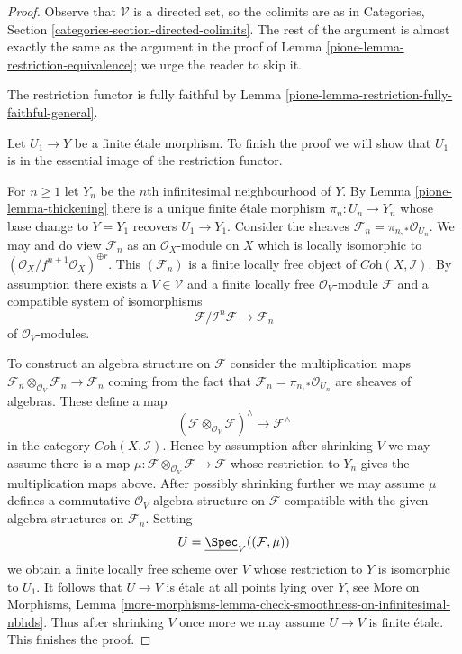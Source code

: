 \begin{proof}

Observe that $\mathcal{V}$ is a directed set, so the colimits are
as in Categories, Section \ref{categories-section-directed-colimits}.
The rest of the argument is almost exactly the same as the argument
in the proof of Lemma \ref{pione-lemma-restriction-equivalence}; we urge
the reader to skip it.

\medskip\noindent
The restriction functor is fully faithful by
Lemma \ref{pione-lemma-restriction-fully-faithful-general}.

\medskip\noindent
Let $U_1 \to Y$ be a finite \'etale morphism. To finish the proof
we will show that $U_1$ is in the essential image of the
restriction functor.

\medskip\noindent
For $n \geq 1$ let $Y_n$ be the $n$th infinitesimal neighbourhood of $Y$.
By Lemma \ref{pione-lemma-thickening}
there is a unique finite \'etale morphism
$\pi_n : U_n \to Y_n$ whose base change to $Y = Y_1$
recovers $U_1 \to Y_1$.
Consider the sheaves $\mathcal{F}_n = \pi_{n, *}\mathcal{O}_{U_n}$.
We may and do view $\mathcal{F}_n$ as an $\mathcal{O}_X$-module on $X$
which is locally isomorphic to
$(\mathcal{O}_X/f^{n + 1}\mathcal{O}_X)^{\oplus r}$.
This $(\mathcal{F}_n)$ is a finite locally free object of
$\textit{Coh}(X, \mathcal{I})$.
By assumption there exists a $V \in \mathcal{V}$
and a finite locally free $\mathcal{O}_V$-module $\mathcal{F}$
and a compatible system of isomorphisms
$$
\mathcal{F}/\mathcal{I}^n\mathcal{F} \to \mathcal{F}_n
$$
of $\mathcal{O}_V$-modules.

\medskip\noindent
To construct an algebra structure on $\mathcal{F}$ consider the multiplication
maps
$\mathcal{F}_n \otimes_{\mathcal{O}_V} \mathcal{F}_n \to \mathcal{F}_n$
coming from the fact that $\mathcal{F}_n = \pi_{n, *}\mathcal{O}_{U_n}$
are sheaves of algebras. These define a map
$$
(\mathcal{F}\otimes_{\mathcal{O}_V} \mathcal{F})^\wedge
\longrightarrow
\mathcal{F}^\wedge
$$
in the category $\textit{Coh}(X, \mathcal{I})$. Hence by assumption
after shrinking $V$ we may assume there is a map
$\mu : \mathcal{F}\otimes_{\mathcal{O}_V} \mathcal{F} \to \mathcal{F}$
whose restriction to $Y_n$ gives the multiplication maps above.
After possibly shrinking further we may assume $\mu$
defines a commutative $\mathcal{O}_V$-algebra
structure on $\mathcal{F}$ compatible with the given algebra
structures on $\mathcal{F}_n$.
Setting
$$
U = \underline{\Spec}_V((\mathcal{F}, \mu))
$$
we obtain a finite locally free scheme over $V$ whose restriction
to $Y$ is isomorphic to $U_1$. It follows that $U \to V$
is \'etale at all points lying over $Y$, see
More on Morphisms, Lemma
\ref{more-morphisms-lemma-check-smoothness-on-infinitesimal-nbhds}.
Thus after shrinking $V$ once more we may assume $U \to V$ is
finite \'etale. This finishes the proof.
\end{proof}

